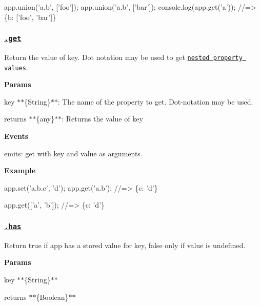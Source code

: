 \begin{DoxyCode}
app.union('a.b', ['foo']);
app.union('a.b', ['bar']);
console.log(app.get('a'));
//=> \{b: ['foo', 'bar']\}
\end{DoxyCode}


\subsubsection*{\href{index.js#L144}{\tt .get}}

Return the value of {\ttfamily key}. Dot notation may be used to get \href{https://github.com/jonschlinkert/get-value}{\tt nested property values}.

{\bfseries Params}


\begin{DoxyItemize}
\item {\ttfamily key} $\ast$$\ast$\{String\}$\ast$$\ast$\+: The name of the property to get. Dot-\/notation may be used.
\item {\ttfamily returns} $\ast$$\ast$\{any\}$\ast$$\ast$\+: Returns the value of {\ttfamily key}
\end{DoxyItemize}

{\bfseries Events}


\begin{DoxyItemize}
\item {\ttfamily emits}\+: {\ttfamily get} with {\ttfamily key} and {\ttfamily value} as arguments.
\end{DoxyItemize}

{\bfseries Example}


\begin{DoxyCode}
app.set('a.b.c', 'd');
app.get('a.b');
//=> \{c: 'd'\}

app.get(['a', 'b']);
//=> \{c: 'd'\}
\end{DoxyCode}


\subsubsection*{\href{index.js#L171}{\tt .has}}

Return true if app has a stored value for {\ttfamily key}, false only if value is {\ttfamily undefined}.

{\bfseries Params}


\begin{DoxyItemize}
\item {\ttfamily key} $\ast$$\ast$\{String\}$\ast$$\ast$
\item {\ttfamily returns} $\ast$$\ast$\{Boolean\}$\ast$$\ast$
\end{DoxyItemize}

